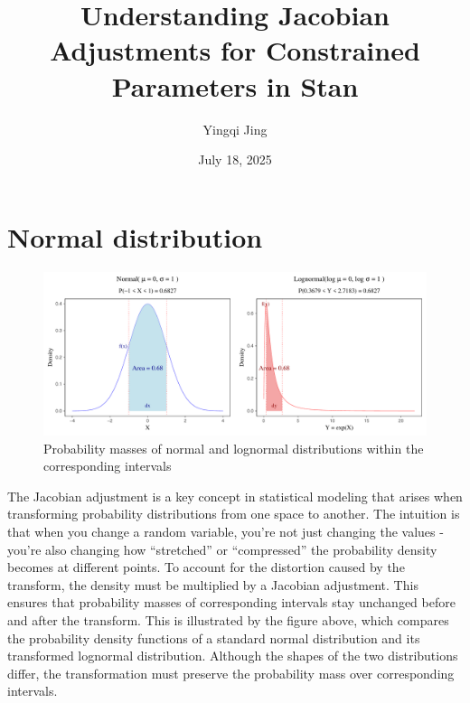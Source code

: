 \documentclass[
  letterpaper,
  DIV=11,
  numbers=noendperiod]{scrartcl}
\title{Understanding Jacobian Adjustments for Constrained Parameters in
Stan}
\author{Yingqi Jing}
\date{July 18, 2025}
\renewcommand*\contentsname{Table of contents}
\newcommand\contentsname{Table of contents}
\begin{document}
\maketitle

\renewcommand*\contentsname{Contents}
{
\hypersetup{linkcolor=}
\setcounter{tocdepth}{4}
\tableofcontents
}
\listoffigures
\listoftables

\clearpage

\section{Normal distribution}\label{normal-distribution}

\begin{figure}[H]

{\centering \includegraphics{figures/unnamed-chunk-1-1.pdf}

}

\caption{Probability masses of normal and lognormal distributions within
the corresponding intervals}

\end{figure}%

The Jacobian adjustment is a key concept in statistical modeling that
arises when transforming probability distributions from one space to
another. The intuition is that when you change a random variable, you're
not just changing the values - you're also changing how ``stretched'' or
``compressed'' the probability density becomes at different points. To
account for the distortion caused by the transform, the density must be
multiplied by a Jacobian adjustment. This ensures that probability
masses of corresponding intervals stay unchanged before and after the
transform. This is illustrated by the figure above, which compares the
probability density functions of a standard normal distribution and its
transformed lognormal distribution. Although the shapes of the two
distributions differ, the transformation must preserve the probability
mass over corresponding intervals.
\end{document}
